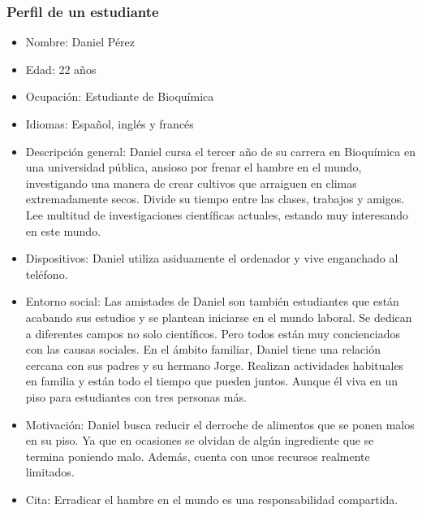 \begin{enumerate}
\subsubsection{Perfil de un estudiante}
\begin{itemize}
    \item Nombre: Daniel Pérez
    \item Edad: 22 años
    \item Ocupación: Estudiante de Bioquímica
    \item Idiomas: Español, inglés y francés
    \item Descripción general: Daniel cursa el tercer año de su carrera en Bioquímica en una universidad pública, ansioso por frenar el hambre en el mundo, investigando una manera de crear cultivos que arraiguen en climas extremadamente secos. Divide su tiempo entre las clases, trabajos y amigos. Lee multitud de investigaciones científicas actuales, estando muy interesando en este mundo.
    \item Dispositivos: Daniel utiliza asiduamente el ordenador y vive enganchado al teléfono.
    \item Entorno social: Las amistades de Daniel son también estudiantes que están acabando sus estudios y se plantean iniciarse en el mundo laboral. Se dedican a diferentes campos no solo científicos. Pero todos están muy concienciados con las causas sociales. En el ámbito familiar, Daniel tiene una relación cercana con sus padres y su hermano Jorge. Realizan actividades habituales en familia y están todo el tiempo que pueden juntos. Aunque él viva en un piso para estudiantes con tres personas más.
    \item Motivación: Daniel busca reducir el derroche de alimentos que se ponen malos en su piso. Ya que en ocasiones se olvidan de algún ingrediente que se termina poniendo malo. Además, cuenta con unos recursos realmente limitados. 
    \item Cita: Erradicar el hambre en el mundo es una responsabilidad compartida.
\end{itemize}


\end{enumerate}
